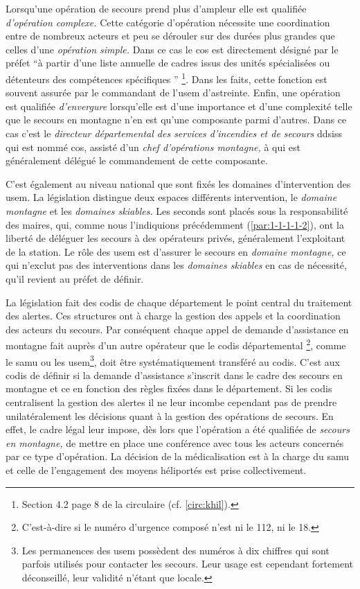 Lorsqu'une opération de secours prend plus d'ampleur elle est
qualifiée \emph{d'opération complexe.}  Cette catégorie d'opération
nécessite une coordination entre de nombreux acteurs et peu se
dérouler sur des durées plus grandes que celles d'une \emph{opération
  simple.} Dans ce cas le \ac{cos} est directement désigné par le
préfet \enquote{à partir d’une liste annuelle de cadres issus des
  unités spécialisées ou détenteurs des compétences spécifiques
  \textelp{}} \footnote{Section 4.2 page 8 de la circulaire 
  (cf. \autoref{circ:khil}).}. Dans les faits, cette fonction est
souvent assurée par le commandant de l'\ac{usem} d'astreinte. Enfin,
une opération est qualifiée \emph{d'envergure} lorsqu'elle est d'une
importance et d'une complexité telle que le secours en montagne n'en
est qu'une composante parmi d'autres. Dans ce cas c'est le
\emph{directeur départemental des services d'incendies et de secours}
\acp{ddsis} qui est nommé \ac{cos}, assisté d'un \emph{chef
  d'opérations montagne,} à qui est généralement délégué le
commandement de cette composante.

C'est également au niveau national que sont fixés les domaines
d'intervention des \ac{usem}. La législation distingue deux espaces
différents intervention, le \emph{domaine montagne} et les
\emph{domaines skiables.} Les seconds sont placés sous la
responsabilité des maires, qui, comme nous l'indiquions précédemment
(\ref{par:1-1-1-1-2}), ont la liberté de déléguer les secours à des
opérateurs privés, généralement l'exploitant de la station. Le rôle
des \ac{usem} est d'assurer le secours en \emph{domaine montagne,} ce
qui n’exclut pas des interventions dans les \emph{domaines skiables} en
cas de nécessité, qu'il revient au préfet de définir.

La législation fait des \ac{codis} de chaque département le point
central du traitement des alertes. Ces structures ont à charge la
gestion des appels et la coordination des acteurs du secours. Par
conséquent chaque appel de demande d'assistance en montagne fait
auprès d'un autre opérateur que le \ac{codis} départemental
\footnote{C'est-à-dire si le numéro d'urgence composé n'est ni le 112,
  ni le 18.}, comme le \ac{samu} ou les \ac{usem}\footnote{Les
  permanences des \ac{usem} possèdent des numéros à dix chiffres qui
  sont parfois utilisés pour contacter les secours. Leur usage est
  cependant fortement déconseillé, leur validité n'étant que locale.},
doit être systématiquement transféré au \ac{codis}. C'est aux
\ac{codis} de définir si la demande d'assistance s'inscrit dans le
cadre des secours en montagne et ce en fonction des règles fixées dans
le département.  Si les \ac{codis} centralisent la gestion des alertes
il ne leur incombe cependant pas de prendre unilatéralement les
décisions quant à la gestion des opérations de secours. En effet, le
cadre légal leur impose, dès lors que l’opération a été qualifiée de
\emph{secours en montagne,} de mettre en place une conférence avec
tous les acteurs concernés par ce type d'opération. La décision de la
médicalisation est à la charge du \ac{samu} et celle de l'engagement
des moyens héliportés est prise collectivement.

